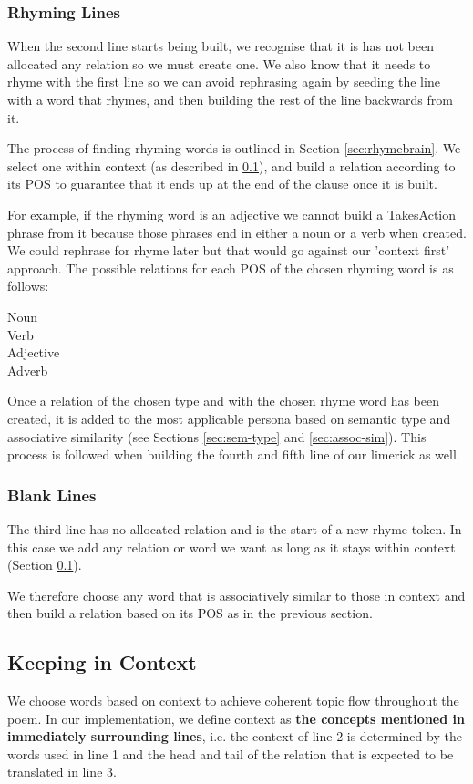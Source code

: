 \subsubsection{Rhyming Lines}
When the second line starts being built, we recognise that it is has not been allocated any relation so we must create one. We also know that it needs to rhyme with the first line so we can avoid rephrasing again by seeding the line with a word that rhymes, and then building the rest of the line backwards from it.

The process of finding rhyming words is outlined in Section \ref{sec:rhymebrain}. We select one within context (as described in \ref{sec:context}), and build a relation according to its POS to guarantee that it ends up at the end of the clause once it is built.

For example, if the rhyming word is an adjective we cannot build a TakesAction phrase from it because those phrases end in either a noun or a verb when created. We could rephrase for rhyme later but that would go against our 'context first' approach. The possible relations for each POS of the chosen rhyming word is as follows:
\begin{description}
\item[Noun]
\item[Verb]
\item[Adjective]
\item[Adverb]
\end{description}

Once a relation of the chosen type and with the chosen rhyme word has been created, it is added to the most applicable persona based on semantic type and associative similarity (see Sections \ref{sec:sem-type} and \ref{sec:assoc-sim}). This process is followed when building the fourth and fifth line of our limerick as well.

\subsubsection{Blank Lines}
The third line has no allocated relation and is the start of a new rhyme token. In this case we add any relation or word we want as long as it stays within context (Section \ref{sec:context}).

We therefore choose any word that is associatively similar to those in context and then  build a relation based on its POS as in the previous section.

\subsection{Keeping in Context}
\label{sec:context}
We choose words based on context to achieve coherent topic flow throughout the poem. In our implementation, we define context as \textbf{the concepts mentioned in immediately surrounding lines}, i.e. the context of line 2 is determined by the words used in line 1 and the head and tail of the relation that is expected to be translated in line 3. 

